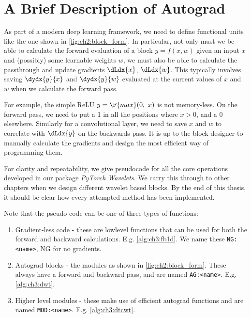 \section{A Brief Description of Autograd}
As part of a modern deep learning framework, we need to define functional units like 
the one shown in \autoref{fig:ch2:block_form}. In particular, not only must we
be able to calculate the forward evaluation of a block $y=f(x,w)$ given an input $x$ and 
(possibly) some learnable weights $w$, we must also be able to
calculate the passthrough and update gradients $\dLdx{x}$, $\dLdx{w}$. This
typically involves saving $\dydx{y}{x}$ and $\dydx{y}{w}$ evaluated at the current
values of $x$ and $w$ when we calculate the forward pass. 

For example, the simple ReLU $y = \F{max}(0,\ x)$ is not memory-less. On the
forward pass, we need to put a 1 in all the positions where $x > 0$, and a 0
elsewhere. Similarly for a convolutional layer, we need to save $x$ and $w$ to
correlate with $\dLdx{y}$ on the backwards pass. It is up to the block designer
to manually calculate the gradients and design the most efficient way of
programming them.

For clarity and repeatability, we give pseudocode for all the core operations
developed in our package \emph{PyTorch Wavelets}. We carry this through to other chapters
when we design different wavelet based blocks. By the end of this thesis, it should be
clear how every attempted method has been implemented.


Note that the pseudo code can be one of three types of functions:
\begin{enumerate}
  \item Gradient-less code - these are lowlevel functions that can be used for
    both the forward and backward calculations. E.g. \autoref{alg:ch3:fb1d}. We
    name these \texttt{NG:<name>}, NG for no gradients.
  \item Autograd blocks - the modules as shown in
    \autoref{fig:ch2:block_form}. These always have a forward and backward pass, and 
    are named \texttt{AG:<name>}. E.g. \autoref{alg:ch3:dwt}.
  \item Higher level modules - these make use of efficient autograd functions
    and are named \texttt{MOD:<name>}. E.g. \autoref{alg:ch3:dtcwt}.
\end{enumerate}

